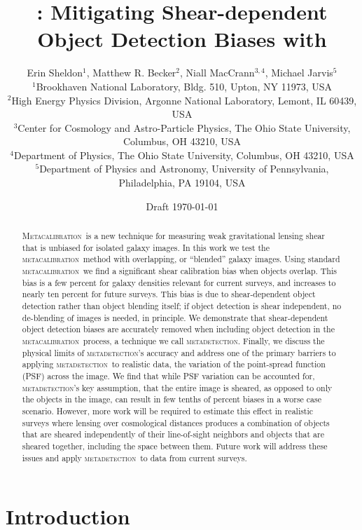 \documentclass[fleqn,useAMS,usenatbib]{mnras}
\title[\Mdet]{\Mdet: Mitigating Shear-dependent Object Detection Biases with \Mcal}
\author[Sheldon et~al.]{Erin Sheldon$^1$, Matthew R. Becker$^2$,
Niall MacCrann$^{3,4}$, Michael Jarvis$^5$
  \\$^1$Brookhaven National Laboratory, Bldg. 510, Upton, NY 11973, USA
  \\$^2$High Energy Physics Division, Argonne National Laboratory, Lemont, IL 60439, USA
  \\$^3$Center for Cosmology and Astro-Particle Physics, The Ohio State University, Columbus, OH 43210, USA
  \\$^4$Department of Physics, The Ohio State University, Columbus, OH 43210, USA
  \\$^5$Department of Physics and Astronomy, University of Pennsylvania, Philadelphia, PA 19104, USA
}
\newcommand{\mcal}{\textsc{metacalibration}}
\newcommand{\mdet}{\textsc{metadetection}}
\newcommand{\Mcal}{\textsc{Metacalibration}}
\begin{document}
\date{Draft \today}
\maketitle

\begin{abstract}

    \Mcal\ is a new technique for measuring weak gravitational lensing shear
    that is unbiased for isolated galaxy images.  In this work we test the
    \mcal\ method with overlapping, or ``blended'' galaxy images.  Using
    standard \mcal\ we find a significant shear calibration bias when objects
    overlap.  This bias is a few percent for galaxy densities relevant for
    current surveys, and increases to nearly ten percent for future surveys.
    This bias is due to shear-dependent object detection rather than object
    blending itself; if object detection is shear independent, no de-blending
    of images is needed, in principle.  We demonstrate that shear-dependent
    object detection biases are accurately removed when including object
    detection in the \mcal\ process, a technique we call \mdet. Finally, we
    discuss the physical limits of \mdet's accuracy and address one of the
    primary barriers to applying \mdet\ to realistic data, the variation of the
    point-spread function (PSF) across the image. We find that while PSF variation
    can be accounted for, \mdet's key assumption, that the entire image is
    sheared, as opposed to only the objects in the image, can result in few
    tenths of percent biases in a worse case scenario. However, more work will
    be required to estimate this effect in realistic surveys where lensing over
    cosmological distances produces a combination of objects that are sheared
    independently of their line-of-sight neighbors and objects that are sheared
    together, including the space between them. Future work will address these
    issues and apply \mdet\ to data from current surveys.

\end{abstract}

\section{Introduction}
\end{document}
